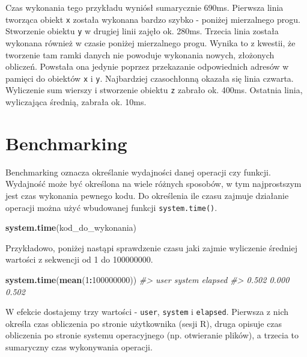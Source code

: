 \documentclass[paper=6in:9in,pagesize=pdftex,headinclude=on,footinclude=on,10pt]{scrbook}
\newenvironment{Shaded}{\begin{snugshade}}{\end{snugshade}}
\newcommand{\CommentTok}[1]{\textcolor[rgb]{0.56,0.35,0.01}{\textit{#1}}}
\newcommand{\DecValTok}[1]{\textcolor[rgb]{0.00,0.00,0.81}{#1}}
\newcommand{\KeywordTok}[1]{\textcolor[rgb]{0.13,0.29,0.53}{\textbf{#1}}}
\newcommand{\NormalTok}[1]{#1}
\newcommand{\OperatorTok}[1]{\textcolor[rgb]{0.81,0.36,0.00}{\textbf{#1}}}
\begin{document}
Czas wykonania tego przykładu wyniósł sumarycznie 690ms.
Pierwsza linia tworząca obiekt \texttt{x} została wykonana bardzo szybko - poniżej mierzalnego progu.
Stworzenie obiektu \texttt{y} w drugiej linii zajęło ok. 280ms.
Trzecia linia została wykonana również w czasie poniżej mierzalnego progu.
Wynika to z kwestii, że tworzenie tam ramki danych nie powoduje wykonania nowych, złożonych obliczeń.
Powstała ona jedynie poprzez przekazanie odpowiednich adresów w pamięci do obiektów \texttt{x} i \texttt{y}.
Najbardziej czasochłonną okazała się linia czwarta.
Wyliczenie sum wierszy i stworzenie obiektu \texttt{z} zabrało ok. 400ms.
Ostatnia linia, wyliczająca średnią, zabrała ok. 10ms.

\hypertarget{benchmarking}{%
\section{Benchmarking}\label{benchmarking}}

Benchmarking oznacza określanie wydajności danej operacji czy funkcji.
Wydajność może być określona na wiele różnych sposobów, w tym najprostszym jest czas wykonania pewnego kodu.
Do określenia ile czasu zajmuje działanie operacji można użyć wbudowanej funkcji \texttt{system.time()}.

\begin{Shaded}
\begin{Highlighting}[]
\KeywordTok{system.time}\NormalTok{(kod_do_wykonania)}
\end{Highlighting}
\end{Shaded}

Przykładowo, poniżej nastąpi sprawdzenie czasu jaki zajmie wyliczenie średniej wartości z sekwencji od 1 do 100000000.

\begin{Shaded}
\begin{Highlighting}[]
\KeywordTok{system.time}\NormalTok{(}\KeywordTok{mean}\NormalTok{(}\DecValTok{1}\OperatorTok{:}\DecValTok{100000000}\NormalTok{))}
\CommentTok{#>    user  system elapsed }
\CommentTok{#>   0.502   0.000   0.502}
\end{Highlighting}
\end{Shaded}

W efekcie dostajemy trzy wartości - \texttt{user}, \texttt{system} i \texttt{elapsed}. Pierwsza z nich określa czas obliczenia po stronie użytkownika (sesji R), druga opisuje czas obliczenia po stronie systemu operacyjnego (np. otwieranie plików), a trzecia to sumaryczny czas wykonywania operacji.
\end{document}
